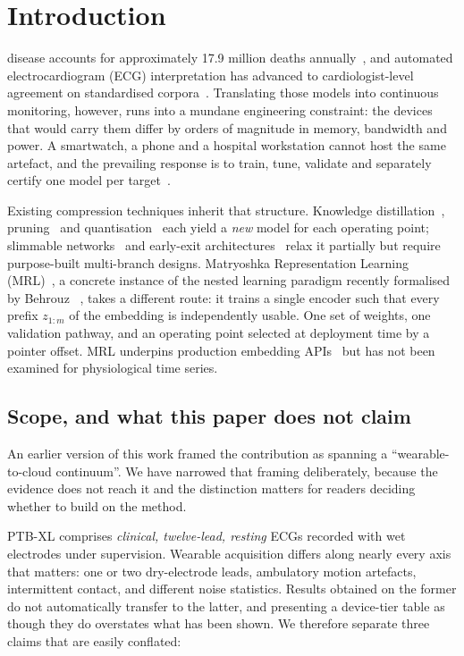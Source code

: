 \section{Introduction}

 disease accounts for approximately 17.9
million deaths annually~\cite{who2023cvd}, and automated electrocardiogram
(ECG) interpretation has advanced to cardiologist-level agreement on
standardised corpora~\cite{hannun2019,ribeiro2020}. Translating those models
into continuous monitoring, however, runs into a mundane engineering
constraint: the devices that would carry them differ by orders of magnitude in
memory, bandwidth and power. A smartwatch, a phone and a hospital workstation
cannot host the same artefact, and the prevailing response is to train, tune,
validate and separately certify one model per target~\cite{rajpurkar2022}.

Existing compression techniques inherit that structure. Knowledge
distillation~\cite{hinton2015}, pruning~\cite{han2016} and
quantisation~\cite{jacob2018} each yield a \emph{new} model for each operating
point; slimmable networks~\cite{yu2019} and early-exit
architectures~\cite{teerapittayanon2016} relax it partially but require
purpose-built multi-branch designs. Matryoshka Representation Learning
(MRL)~\cite{kusupati2022}, a concrete instance of the nested learning paradigm
recently formalised by Behrouz \etal~\cite{behrouz2025}, takes a different
route: it trains a single encoder such that every prefix $z_{1:m}$ of the
embedding is independently usable. One set of weights, one validation
pathway, and an operating point selected at deployment time by a pointer
offset. MRL underpins production embedding APIs~\cite{openai2024embeddings,
google2025gemma3n} but has not been examined for physiological time series.

\subsection{Scope, and what this paper does not claim}

An earlier version of this work framed the contribution as spanning a
``wearable-to-cloud continuum''. We have narrowed that framing deliberately,
because the evidence does not reach it and the distinction matters for
readers deciding whether to build on the method.

PTB-XL comprises \emph{clinical, twelve-lead, resting} ECGs recorded with wet
electrodes under supervision. Wearable acquisition differs along nearly every
axis that matters: one or two dry-electrode leads, ambulatory motion
artefacts, intermittent contact, and different noise statistics. Results
obtained on the former do not automatically transfer to the latter, and
presenting a device-tier table as though they do overstates what has been
shown. We therefore separate three claims that are easily conflated:

